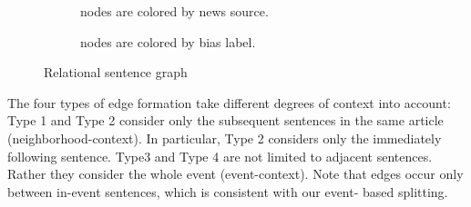 \documentclass[letterpaper]{article} %
\begin{document}
\begin{figure}[!htbp]
\begin{subfigure}[t]{.35\linewidth}
    \caption{\scriptsize nodes are colored by news source.}
    \label{subfig:mattissrc}
  \end{subfigure}
  \begin{subfigure}[t]{.35\linewidth}
    \caption{\scriptsize nodes are colored by bias label.}
    \label{subfig:mattisbias}
  \end{subfigure}
   \caption{\scriptsize Relational sentence graph} 
  \label{fig:adg}
\end{figure}



The four types of edge formation take different degrees of context into account: Type 1 and Type 2 consider only the subsequent sentences in the same article (neighborhood-context). In particular, Type 2 considers only the immediately following sentence. Type3 and Type 4 are not limited to adjacent sentences. Rather they consider the whole event (event-context). Note that edges occur only between in-event sentences, which is consistent with our event- based splitting.
\end{document}
